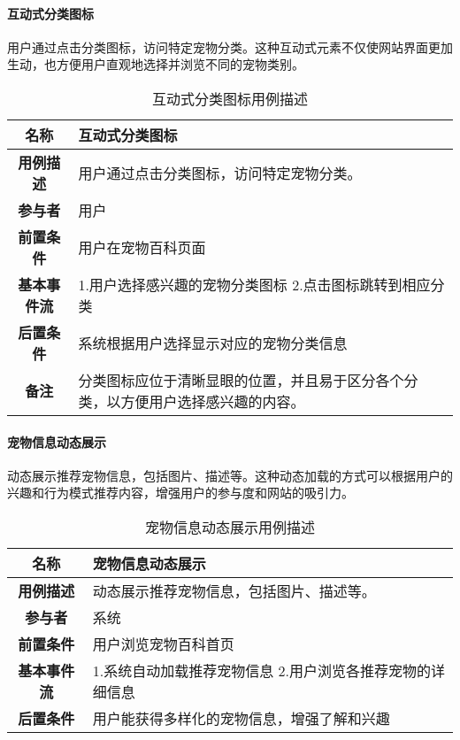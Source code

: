 \paragraph{互动式分类图标}

用户通过点击分类图标，访问特定宠物分类。这种互动式元素不仅使网站界面更加生动，也方便用户直观地选择并浏览不同的宠物类别。

\begin{table}[H]
	\centering
	\caption{互动式分类图标用例描述}
	\renewcommand\arraystretch{1.5}
	\begin{tabular}{|c|>{\raggedright\arraybackslash}p{10cm}|}
		\hline
		\textbf{名称} & \textbf{互动式分类图标} \\ \hline
		\textbf{用例描述} & 用户通过点击分类图标，访问特定宠物分类。 \\ \hline
		\textbf{参与者} & 用户 \\ \hline
		\textbf{前置条件} & 用户在宠物百科页面 \\ \hline
		\textbf{基本事件流} & 
		1.用户选择感兴趣的宠物分类图标\newline
		2.点击图标跳转到相应分类\\
		\hline
		\textbf{后置条件} & 系统根据用户选择显示对应的宠物分类信息 \\ \hline
		\textbf{备注} & 分类图标应位于清晰显眼的位置，并且易于区分各个分类，以方便用户选择感兴趣的内容。 \\ \hline
	\end{tabular}
\end{table}

\paragraph{宠物信息动态展示}

动态展示推荐宠物信息，包括图片、描述等。这种动态加载的方式可以根据用户的兴趣和行为模式推荐内容，增强用户的参与度和网站的吸引力。

\begin{table}[H]
	\centering
	\caption{宠物信息动态展示用例描述}
	\renewcommand\arraystretch{1.5}
	\begin{tabular}{|c|>{\raggedright\arraybackslash}p{10cm}|}
		\hline
		\textbf{名称} & \textbf{宠物信息动态展示} \\ \hline
		\textbf{用例描述} & 动态展示推荐宠物信息，包括图片、描述等。 \\ \hline
		\textbf{参与者} & 系统 \\ \hline
		\textbf{前置条件} & 用户浏览宠物百科首页 \\ \hline
		\textbf{基本事件流} &
		1.系统自动加载推荐宠物信息\newline
		2.用户浏览各推荐宠物的详细信息\\
		\hline
		\textbf{后置条件} & 用户能获得多样化的宠物信息，增强了解和兴趣 \\ \hline
	\end{tabular}
\end{table}

